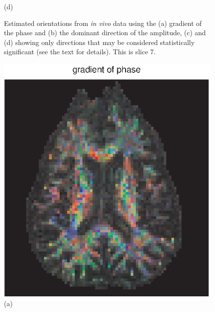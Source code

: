 \documentclass[authoryear,preprint,12pt]{elsarticle}
\begin{document}
\begin{figure}[p]
\begin{center}
\begin{minipage}[]{.42\textwidth}
      (d)
    \end{minipage}
  \end{center}
  \caption{Estimated orientations from {\em in vivo} data using the
    (a) gradient of the phase and (b) the dominant direction of the
    amplitude, (c) and (d) showing only directions that may be
    considered statistically significant (see the text for
    details). This is slice 7.}
  \label{fig1b} 
\end{figure}

\begin{figure}[p]
  \begin{center}
      \begin{minipage}[]{0.42\textwidth}
      \centering
      \includegraphics[width=\textwidth]{gradphase55any.eps}
       (a)
    \end{minipage}
      \begin{minipage}[]{0.42\textwidth}
      \centering

\end{minipage}
\end{center}
\end{figure}
\end{document}
